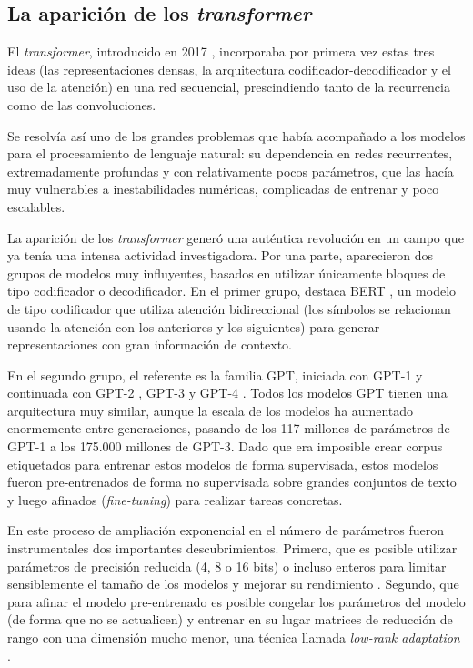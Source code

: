 \subsection{La aparición de los \textit{transformer}}
El \textit{transformer}, introducido en 2017 \cite{vaswani2017attention}, incorporaba por primera vez estas tres ideas (las representaciones densas, la arquitectura codificador-decodificador y el uso de la atención) en una red secuencial, prescindiendo tanto de la recurrencia como de las convoluciones. 

Se resolvía así uno de los grandes problemas que había acompañado a los modelos para el procesamiento de lenguaje natural: su dependencia en redes recurrentes, extremadamente profundas y con relativamente pocos parámetros, que las hacía muy vulnerables a inestabilidades numéricas, complicadas de entrenar y poco escalables.

La aparición de los \textit{transformer} generó una auténtica revolución en un campo que ya tenía una intensa actividad investigadora. Por una parte, aparecieron dos grupos de modelos muy influyentes, basados en utilizar únicamente bloques de tipo codificador o decodificador. En el primer grupo, destaca BERT \cite{devlin2018bert}, un modelo de tipo codificador que utiliza atención bidireccional (los símbolos se relacionan usando la atención con los anteriores y los siguientes) para generar representaciones con gran información de contexto. 

En el segundo grupo, el referente es la familia GPT, iniciada con GPT-1 \cite{radford2018improving} y continuada con GPT-2 \cite{gpt2trained}, GPT-3 \cite{brown2020language} y GPT-4 \cite{gpt-4}. Todos los modelos GPT tienen una arquitectura muy similar, aunque la escala de los modelos ha aumentado enormemente entre generaciones, pasando de los 117 millones de parámetros de GPT-1 a los 175.000 millones de GPT-3. Dado que era imposible crear corpus etiquetados para entrenar estos modelos de forma supervisada, estos modelos fueron pre-entrenados de forma no supervisada sobre grandes conjuntos de texto y luego afinados (\textit{fine-tuning}) para realizar tareas concretas.

En este proceso de ampliación exponencial en el número de parámetros fueron instrumentales dos importantes descubrimientos. Primero, que es posible utilizar parámetros de precisión reducida (4, 8 o 16 bits) o incluso enteros para limitar sensiblemente el tamaño de los modelos y mejorar su rendimiento \cite{wu2020integer}. Segundo, que para afinar el modelo pre-entrenado es posible congelar los parámetros del modelo (de forma que no se actualicen) y entrenar en su lugar matrices de reducción de rango con una dimensión mucho menor, una técnica llamada \textit{low-rank adaptation} \cite{hu2021lora}.

